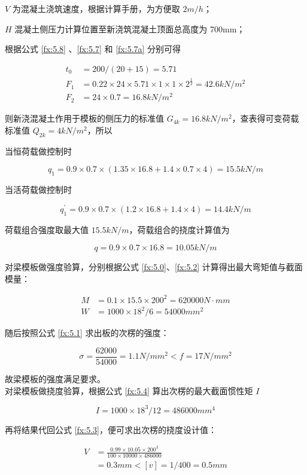$V$ 为混凝土浇筑速度，根据计算手册，为方便取 $2 m/h$；

$H$ 混凝土侧压力计算位置至新浇筑混凝土顶面总高度为 700mm；

根据公式 \ref{fx:5.8} 、\ref{fx:5.7} 和 \ref{fx:5.7a} 分别可得 

    \begin{align*}
        t_0&=200/(20+15)=5.71\\
        F_1&=0.22\times 24\times 5.71\times 1\times 1\times 2^{\frac{1}{2}}=42.6 kN/m^2\\
        F_2&=24\times 0.7=16.8 kN/m^2
    \end{align*}

则新浇混凝土作用于模板的侧压力的标准值 $G_{4k}=16.8 kN/m^2$，查表得可变荷载标准值 $Q_{2k}=4 kN/m^2$，所以

当恒荷载做控制时

\[
    q_1=0.9\times 0.7\times (1.35\times 16.8+1.4\times 0.7\times 4)=15.5 kN/m
\]

当活荷载做控制时

\[
    q_1^{'}=0.9\times 0.7\times (1.2\times 16.8+1.4\times 4)=14.4 kN/m
\]

荷载组合强度取最大值 $15.5 kN/m$，荷载组合的挠度计算值为

\[
    q=0.9\times 0.7\times 16.8=10.05 kN/m
\]

对梁模板做强度验算，分别根据公式 \ref{fx:5.0}、\ref{fx:5.2} 计算得出最大弯矩值与截面模量：

\begin{align*}
    M&=0.1\times 15.5\times 200^2=620000 N \cdot mm\\
    W&=1000\times 18^2 /6=54000 mm^2
\end{align*}

随后按照公式 \ref{fx:5.1} 求出板的次楞的强度：

\[
    \sigma = \frac{62000}{54000}=1.1 N/mm^2< f=17N/mm^2
\]

故梁模板的强度满足要求。\\

对梁模板做挠度验算，根据公式 \ref{fx:5.4} 算出次楞的最大截面惯性矩 $I$

\[
    I=1000\times 18^3 /12=486000 mm^4
\]

再将结果代回公式 \ref{fx:5.3}，便可求出次楞的挠度设计值：

\begin{align*}
    V&=\frac{0.99\times 10.05 \times 200^3}{100\times 10000\times 486000}\\
    &=0.3 mm<[v]=1/400=0.5mm
\end{align*}

